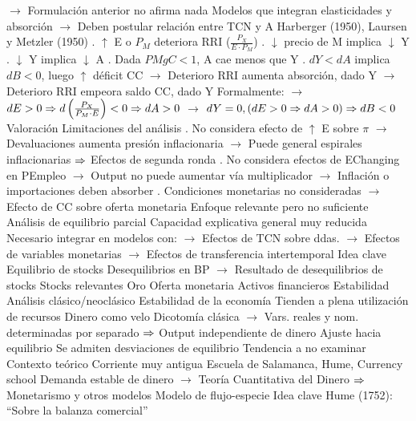 \documentclass{nuevotema}
\begin{document}
\begin{esquemal}
				\4[] $\to$ Formulación anterior no afirma nada
				\4[] Modelos que integran elasticidades y absorción
				\4[] $\to$ Deben postular relación entre TCN y A
				\4[] Harberger (1950), Laursen y Metzler (1950)
				. $\uparrow$ E o $P_M$ deteriora RRI ($\frac{P_X}{E \cdot P_M}$)
				. $\downarrow$ precio de M implica $\downarrow$ Y
				. $\downarrow$ Y implica $\downarrow$ A
				. Dada $PMgC < 1$, A cae menos que Y
				. $dY < dA$ implica $dB <0$, luego $\uparrow$ déficit CC
				\4[] $\to$ Deterioro RRI aumenta absorción, dado Y
				\4[] $\to$ Deterioro RRI empeora saldo CC, dado Y
				\4[] Formalmente:
				\4[] $\to$ $d E > 0 \Rightarrow d \left( \frac{P_X}{P_M \cdot E} \right) < 0 \Rightarrow dA >0$
				\4[] $\to$ $dY = 0, (dE > 0 \Rightarrow dA > 0) \Rightarrow d B < 0$
			\3 Valoración
				\4 Limitaciones del análisis
				. No considera efecto de $\uparrow$ E sobre $\pi$
				\4[] $\to$ Devaluaciones aumenta presión inflacionaria
				\4[] $\to$ Puede general espirales inflacionarias
				\4[] $\Rightarrow$ Efectos de segunda ronda
				. No considera efectos de EChanging en PEmpleo
				\4[] $\to$ Output no puede aumentar vía multiplicador
				\4[] $\to$ Inflación o importaciones deben absorber
				. Condiciones monetarias no consideradas
				\4[] $\to$ Efecto de CC sobre oferta monetaria
				\4 Enfoque relevante pero no suficiente
				\4[] Análisis de equilibrio parcial
				\4[] Capacidad explicativa general muy reducida
				\4[] Necesario integrar en modelos con:
				\4[] $\to$ Efectos de TCN sobre ddas.
				\4[] $\to$ Efectos de variables monetarias
				\4[] $\to$ Efectos de transferencia intertemporal
	\1 
		\2 Idea clave
			\3 Equilibrio de stocks
				\4 Desequilibrios en BP
				\4[] $\to$ Resultado de desequilibrios de stocks
				\4 Stocks relevantes
				\4[] Oro
				\4[] Oferta monetaria
				\4[] Activos financieros
			\3 Estabilidad
				\4 Análisis clásico/neoclásico
				\4 Estabilidad de la economía
				\4[] Tienden a plena utilización de recursos
				\4 Dinero como velo
				\4[] Dicotomía clásica
				\4[] $\to$ Vars. reales y nom. determinadas por separado
				\4[] $\Rightarrow$ Output independiente de dinero
				\4 Ajuste hacia equilibrio
				\4[] Se admiten desviaciones de equilibrio
				\4[] Tendencia a no examinar
			\3 Contexto teórico
				\4 Corriente muy antigua
				\4[] Escuela de Salamanca, Hume, Currency school
				\4 Demanda estable de dinero
				\4[] $\to$ Teoría Cuantitativa del Dinero
				\4[] $\Rightarrow$ Monetarismo y otros modelos
		\2 Modelo de flujo-especie
			\3 Idea clave
				\4 Hume (1752): ``Sobre la balanza comercial''

\end{esquemal}
\end{document}
